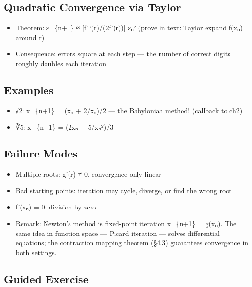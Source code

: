 \documentclass[
  10pt,
  letterpaper,
]{scrbook}
\providecommand{\tightlist}{%
  \setlength{\itemsep}{0pt}\setlength{\parskip}{0pt}}
\begin{document}
\subsection{Quadratic Convergence via
Taylor}\label{quadratic-convergence-via-taylor}

\begin{itemize}
\tightlist
\item
  Theorem: ε\_\{n+1\} ≈ {[}f'\,`(r)/(2f'(r)){]} εₙ² (prove in text:
  Taylor expand f(xₙ) around r)
\item
  Consequence: errors square at each step --- the number of correct
  digits roughly doubles each iteration
\end{itemize}

\subsection{Examples}\label{examples}

\begin{itemize}
\tightlist
\item
  √2: x\_\{n+1\} = (xₙ + 2/xₙ)/2 --- the Babylonian method! (callback to
  ch2)
\item
  ∛5: x\_\{n+1\} = (2xₙ + 5/xₙ²)/3
\end{itemize}

\subsection{Failure Modes}\label{failure-modes}

\begin{itemize}
\item
  Multiple roots: g'(r) ≠ 0, convergence only linear
\item
  Bad starting points: iteration may cycle, diverge, or find the wrong
  root
\item
  f'(xₙ) = 0: division by zero
\item
  Remark: Newton's method is fixed-point iteration x\_\{n+1\} = g(xₙ).
  The same idea in function space --- Picard iteration --- solves
  differential equations; the contraction mapping theorem (§4.3)
  guarantees convergence in both settings.
\end{itemize}

\subsection{Guided Exercise}\label{guided-exercise-18}
\end{document}
